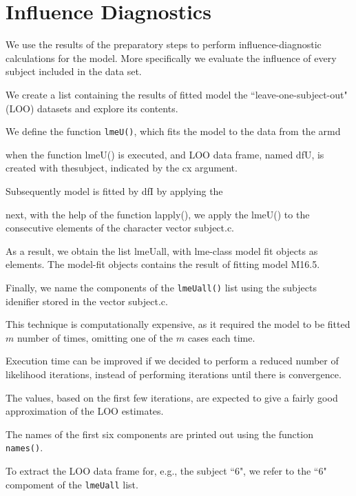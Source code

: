 
\section{Influence Diagnostics}

We use the results of the preparatory steps to perform influence-diagnostic calculations for the model.
More specifically we evaluate the influence of every subject included in the data set.


We create a list containing the results of fitted model the ``leave-one-subject-out" (LOO)
datasets and explore its contents.

We define the function \texttt{lmeU()}, which fits the model to the data from the armd

when the function lmeU() is executed, and LOO data frame, named dfU, is created with thesubject, indicated by the cx argument.

Subsequently model is fitted by dfI by applying the 


next, with the help of the function lapply(), we apply the lmeU() to the consecutive elements of the character vector subject.c.

As a result, we obtain the list lmeUall, with lme-class model fit objects as elements. The model-fit objects contains the result of fitting model
M16.5.

Finally, we name the components of the \texttt{lmeUall()} list using the subjects idenifier stored in the vector subject.c.

This technique is computationally expensive, as it required the model to be fitted $m$ number of times, omitting one of the $m$ cases each time.

Execution time can be improved if we decided to perform a reduced number of likelihood iterations, instead of performing iterations until there is convergence.

The values, based on the first few iterations, are expected to give a fairly good approximation of the LOO estimates.


The names of the first six components are printed out using the function \texttt{names()}.

To extract the LOO data frame for, e.g., the subject ``6", we refer to the ``6" compoment of the
\texttt{lmeUall} list.

